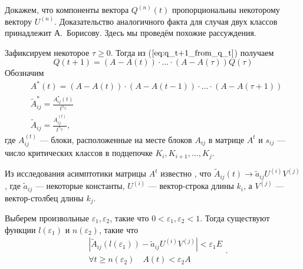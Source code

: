 \documentclass[12pt]{article}
\renewcommand{\geq}{\geqslant}
\renewcommand{\epsilon}{\varepsilon}
\begin{document}
{Докажем, что компоненты вектора $Q^{(n)}(t)$ пропорциональны некоторому вектору $U^{(n)}$. Доказательство аналогичного факта для случая двух классов принадлежит А.~Борисову. Здесь мы проведём похожие рассуждения.

Зафиксируем некоторое $\tau \geq 0$. Тогда из ($\ref{eq:q_t+1_from_q_t}$) получаем
\begin{equation}
\label{eq:q_t+1_from_q_tau}
	Q(t+1) = (A - A(t)) \cdot \ldots \cdot (A - A(\tau)) Q(\tau)
\end{equation}
Обозначим
\begin{equation}
	\begin{split}
		&A^*(t) = (A - A(t)) \cdot (A - A(t-1)) \cdot \ldots \cdot (A - A(\tau + 1)) \\
		&\tilde{A}^*_{ij} = \frac{A^*_{ij}(t)}{t^{s_{ij}}} \\
		&\tilde{A}_{ij} = \frac{A^{(t)}_{ij}}{t^{s_{ij}}},
	\end{split}
\end{equation}
где $A^{(t)}_{ij}$ --- блоки, расположенные на месте блоков $A_{ij}$ в матрице $A^t$ и $s_{ij}$ --- число критических классов в подцепочке $K_i, K_{i+1}, \ldots, K_j$.


Из исследования асимптотики матрицы $A^t$ известно \cite{zhiltsova-about-matrix}, что $\tilde{A}_{ij}(t) \rightarrow \tilde{a}_{ij} U^{(i)} V^{(j)}$, где $\tilde{a}_{ij}$ --- некоторые константы, $U^{(i)}$ --- вектор-строка длины $k_i$, а $V^{(j)}$ --- вектор-столбец длины $k_j$.

Выберем произвольные $\epsilon_1, \epsilon_2$, такие что $0 < \epsilon_1, \epsilon_2 < 1$. Тогда существуют функции $l(\epsilon_1)$ и $n(\epsilon_2)$, такие что
\begin{equation}
	\begin{split}
		&\left| \tilde{A}_{ij}(l(\epsilon_1)) - \tilde{a}_{ij} U^{(i)} V^{(j)} \right| < \epsilon_1 E \\
		&\forall t \geq n(\epsilon_2)\quad A(t) < \epsilon_2 A
	\end{split}.
\end{equation}

}
\end{document}
